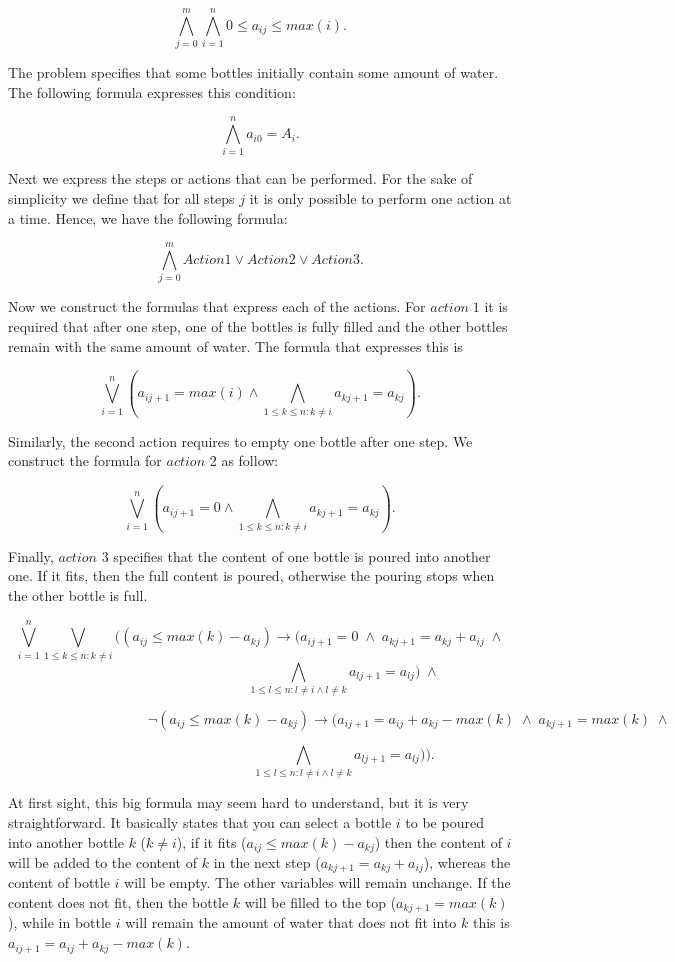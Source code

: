 \[\bigwedge_{j=0}^m \bigwedge_{i=1}^n 0 \leq a_{ij} \leq max(i).\]

The problem specifies that some bottles initially contain some amount of water. The following formula expresses this condition:

\[\bigwedge_{i=1}^n a_{i0} = A_{i}.\]

Next we express the steps or actions that can be performed. For the sake of simplicity we define that for all steps $j$ it is only possible to perform one action at a time. Hence, we have the following formula:

\[\bigwedge_{j=0}^m Action1 \vee Action2 \vee Action3.\]

Now we construct the formulas that express each of the actions. For $action \; 1$ it is required that after one step, one of the bottles is fully filled and the other bottles remain with the same amount of water. The formula that expresses this is

\[\bigvee_{i=1}^n (a_{ij+1} = max(i) \wedge \bigwedge_{1 \leq k \leq n: k \neq i} a_{kj+1} = a_{kj}).\]

Similarly, the second action requires to empty one bottle after one step. We construct the formula for $action$ 2 as follow:

\[\bigvee_{i=1}^n (a_{ij+1} = 0 \wedge \bigwedge_{1 \leq k \leq n: k \neq i} a_{kj+1} = a_{kj}).\]

Finally, $action$ 3 specifies that the content of one bottle is poured into another one. If it fits, then the full content is poured, otherwise the pouring stops when the other bottle is full.

\[\bigvee_{i=1}^n \bigvee_{1 \leq k \leq n: k \neq i} ((a_{ij} \leq max(k) - a_{kj}) \rightarrow (a_{ij+1}=0 \;\wedge\; a_{kj+1} = a_{kj} + a_{ij} \; \wedge\]
\[\qquad \qquad \qquad \qquad \qquad \qquad\bigwedge_{1 \leq l \leq n: l \neq i \wedge l \neq k} a_{lj+1} = a_{lj})\; \wedge \]

\[\qquad \qquad \qquad \qquad \qquad \neg(a_{ij} \leq max(k) - a_{kj}) \rightarrow (a_{ij+1}= a_{ij} + a_{kj} - max(k) \;\wedge\; a_{kj+1} = max(k) \;\wedge \]

\[\qquad \qquad \qquad \qquad \qquad \qquad\bigwedge_{1 \leq l \leq n: l \neq i \wedge l \neq k} a_{lj+1} = a_{lj})) .\]

At first sight, this big formula may seem hard to understand, but it is very straightforward. It basically states that you can select a bottle $i$ to be poured into another bottle $k$ ($k \neq i$), if it fits ($a_{ij} \leq max(k) - a_{kj}$) then the content of $i$ will be added to the content of $k$ in the next step ($a_{kj+1} = a_{kj} + a_{ij}$), whereas the content of bottle $i$ will be empty. The other variables will remain unchange. If the content does not fit, then the bottle $k$ will be filled to the top ($a_{kj+1} = max(k)$), while in bottle $i$ will remain the amount of water that does not fit into $k$ this is $a_{ij+1}= a_{ij} + a_{kj} - max(k)$.

